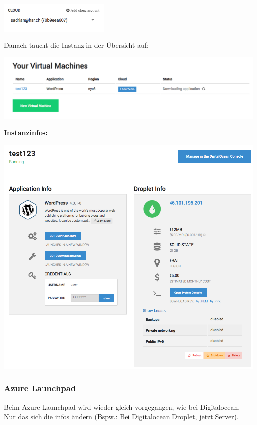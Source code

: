 \includegraphics[width=0.4\textwidth]{./03_Analyse/03_Bitnami/images/digitalocean_account_specific}

Danach taucht die Instanz in der Übersicht auf:

\includegraphics[width=\textwidth]{./03_Analyse/03_Bitnami/images/digitalocean_instances}

\newpage
\textbf{Instanzinfos:}

\includegraphics[width=\textwidth]{./03_Analyse/03_Bitnami/images/digitalocean_instanceinfo}

\subsubsection{Azure Launchpad}
Beim Azure Launchpad wird wieder gleich vorgegangen, wie bei Digitalocean.
Nur das sich die infos ändern (Bspw.: Bei Digitalocean Droplet, jetzt Server).

